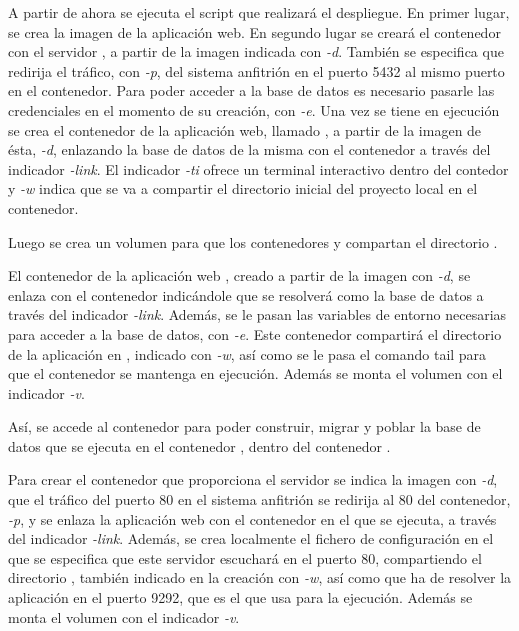 
A partir de ahora se ejecuta el script que realizará el despliegue. En primer lugar, se crea la imagen de la aplicación web. En segundo lugar se creará el contenedor  con el servidor , a partir de la imagen  indicada con \textit{\--d}. También se especifica que redirija el tráfico, con \textit{\--p}, del sistema anfitrión en el puerto 5432 al mismo puerto en el contenedor. Para poder acceder a la base de datos es necesario pasarle las credenciales en el momento de su creación, con \textit{\--e}. Una vez se tiene en ejecución se crea el contenedor de la aplicación web, llamado , a partir de la imagen de ésta, \textit{\--d}, enlazando la base de datos de la misma con el contenedor  a través del indicador \textit{\--link}. El indicador \textit{-ti} ofrece un terminal interactivo dentro del contedor y \textit{-w} indica que se va a compartir el directorio inicial del proyecto local en el contenedor. 

Luego se crea un volumen para que los contenedores  y  compartan el directorio .

El contenedor de la aplicación web , creado a partir de la imagen  con \textit{\--d}, se enlaza con el contenedor  indicándole que se resolverá como la base de datos a través del indicador \textit{\--link}. Además, se le pasan las variables de entorno necesarias para acceder a la base de datos, con \textit{\--e}. Este contenedor compartirá el directorio de la aplicación en , indicado con \textit{\--w}, así como se le pasa el comando tail para que el contenedor se mantenga en ejecución. Además se monta el volumen  con el indicador \textit{\--v}.

Así, se accede al contenedor  para poder construir, migrar y poblar la base de datos que se ejecuta en el contenedor , dentro del contenedor . 

Para crear el contenedor  que proporciona el servidor  se indica la imagen con \textit{\--d}, que el tráfico del puerto 80 en el sistema anfitrión se redirija al 80 del contenedor, \textit{\--p}, y se enlaza la aplicación web con el contenedor en el que se ejecuta, a través del indicador \textit{\--link}. Además, se crea localmente el fichero de configuración  en el que se especifica que este servidor escuchará en el puerto 80, compartiendo el directorio , también indicado en la creación con \textit{\--w}, así como que ha de resolver la aplicación en el puerto 9292, que es el que usa  para la ejecución. Además se monta el volumen  con el indicador \textit{\--v}.

